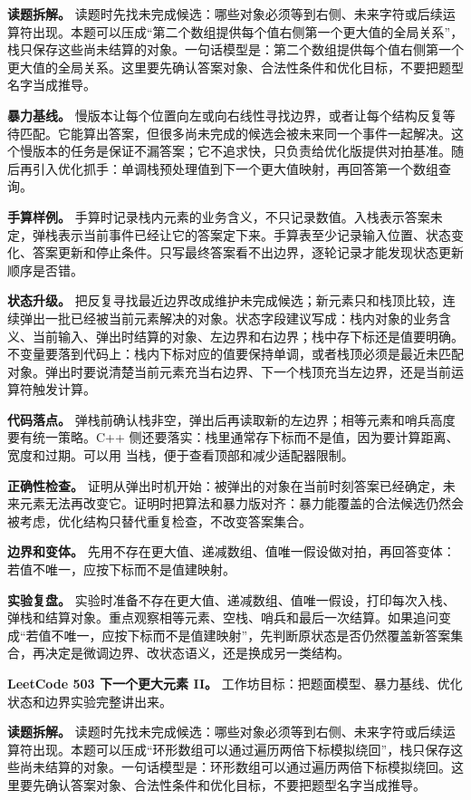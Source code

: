 \textbf{读题拆解。} 读题时先找未完成候选：哪些对象必须等到右侧、未来字符或后续运算符出现。本题可以压成“第二个数组提供每个值右侧第一个更大值的全局关系”，栈只保存这些尚未结算的对象。一句话模型是：第二个数组提供每个值右侧第一个更大值的全局关系。这里要先确认答案对象、合法性条件和优化目标，不要把题型名字当成推导。

\textbf{暴力基线。} 慢版本让每个位置向左或向右线性寻找边界，或者让每个结构反复等待匹配。它能算出答案，但很多尚未完成的候选会被未来同一个事件一起解决。这个慢版本的任务是保证不漏答案；它不追求快，只负责给优化版提供对拍基准。随后再引入优化抓手：单调栈预处理值到下一个更大值映射，再回答第一个数组查询。

\textbf{手算样例。} 手算时记录栈内元素的业务含义，不只记录数值。入栈表示答案未定，弹栈表示当前事件已经让它的答案定下来。手算表至少记录输入位置、状态变化、答案更新和停止条件。只写最终答案看不出边界，逐轮记录才能发现状态更新顺序是否错。

\textbf{状态升级。} 把反复寻找最近边界改成维护未完成候选；新元素只和栈顶比较，连续弹出一批已经被当前元素解决的对象。状态字段建议写成：栈内对象的业务含义、当前输入、弹出时结算的对象、左边界和右边界；栈中存下标还是值要明确。不变量要落到代码上：栈内下标对应的值要保持单调，或者栈顶必须是最近未匹配对象。弹出时要说清楚当前元素充当右边界、下一个栈顶充当左边界，还是当前运算符触发计算。

\textbf{代码落点。} 弹栈前确认栈非空，弹出后再读取新的左边界；相等元素和哨兵高度要有统一策略。C++ 侧还要落实：栈里通常存下标而不是值，因为要计算距离、宽度和过期。可以用  当栈，便于查看顶部和减少适配器限制。

\textbf{正确性检查。} 证明从弹出时机开始：被弹出的对象在当前时刻答案已经确定，未来元素无法再改变它。证明时把算法和暴力版对齐：暴力能覆盖的合法候选仍然会被考虑，优化结构只替代重复检查，不改变答案集合。

\textbf{边界和变体。} 先用不存在更大值、递减数组、值唯一假设做对拍，再回答变体：若值不唯一，应按下标而不是值建映射。

\textbf{实验复盘。} 实验时准备不存在更大值、递减数组、值唯一假设，打印每次入栈、弹栈和结算对象。重点观察相等元素、空栈、哨兵和最后一次结算。如果追问变成“若值不唯一，应按下标而不是值建映射”，先判断原状态是否仍然覆盖新答案集合，再决定是微调边界、改状态语义，还是换成另一类结构。

\noindent\textbf{LeetCode 503 下一个更大元素 II。} 工作坊目标：把题面模型、暴力基线、优化状态和边界实验完整讲出来。

\textbf{读题拆解。} 读题时先找未完成候选：哪些对象必须等到右侧、未来字符或后续运算符出现。本题可以压成“环形数组可以通过遍历两倍下标模拟绕回”，栈只保存这些尚未结算的对象。一句话模型是：环形数组可以通过遍历两倍下标模拟绕回。这里要先确认答案对象、合法性条件和优化目标，不要把题型名字当成推导。

